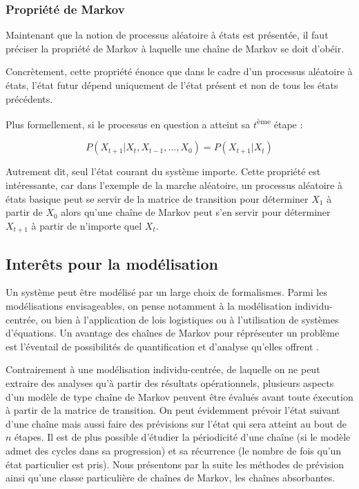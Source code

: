 \documentclass[12pt]{article}
\begin{document}
\subsubsection{Propriété de Markov}

Maintenant que la notion de processus aléatoire à états est présentée,
il faut préciser la propriété de Markov à laquelle une chaîne de
Markov se doit d'obéir.

Concrètement, cette propriété énonce que dans le cadre d'un processus
aléatoire à états, l'état futur dépend uniquement de l'état présent et
non de tous les états précédents.

Plus formellement, si le processus en question a atteint sa
$t$\textsuperscript{ème} étape :

$$
P(X_{t+1} | X_{t}, X_{t-1}, \dots, X_0) = P(X_{t+1} | X_t)
$$

Autrement dit, seul l'état courant du système importe. Cette propriété
est intéressante, car dans l'exemple de la marche aléatoire, un
processus aléatoire à états basique peut se servir de la matrice de
transition pour déterminer $X_1$ à partir de $X_0$ alors qu'une chaîne
de Markov peut s'en servir pour déterminer $X_{t+1}$ à partir de
n'importe quel $X_t$.

\subsection{Interêts pour la modélisation}

Un système peut être modélisé par un large choix de formalismes. Parmi
les modélisations envisageables, on pense notamment à la modélisation
individu-centrée, ou bien à l'application de lois logistiques ou à
l'utilisation de systèmes d'équations. Un avantage des chaînes de
Markov pour réprésenter un problème est l'éventail de possibilités de
quantification et d'analyse qu'elles offrent \cite{izq}.

Contrairement à une modélisation individu-centrée, de laquelle on ne
peut extraire des analyses qu'à partir des résultats opérationnels,
plusieurs aspects d'un modèle de type chaîne de Markov peuvent être
évalués avant toute éxecution à partir de la matrice de transition. On
peut évidemment prévoir l'état suivant d'une chaîne mais aussi faire
des prévisions sur l'état qui sera atteint au bout de $n$ étapes. Il
est de plus possible d'étudier la périodicité d'une chaîne (si le
modèle admet des cycles dans sa progression) et sa récurrence (le
nombre de fois qu'un état particulier est pris). Nous présentons par
la suite les méthodes de prévision ainsi qu'une classe particulière de
chaînes de Markov, les chaînes absorbantes.
\end{document}
